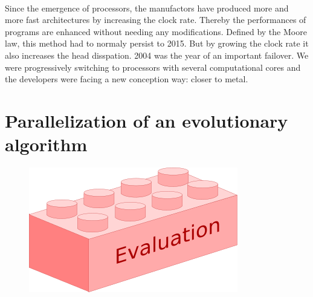 
\paragraph{}

Since the emergence of processors, the manufactors have produced more and more fast architectures by increasing the clock rate. Thereby the performances of programs are enhanced without needing any modifications. Defined by the Moore law, this method had to normaly persist to 2015. But by growing the clock rate it also increases the head disspation. 2004 was the year of an important failover. We were progressively switching to processors with several computational cores and the developers were facing a new conception way: closer to metal.

\section{}


\section{Parallelization of an evolutionary algorithm}

\begin{figure}[H]
  \centering
  \includegraphics[scale=0.5]{images/evaluation_box}
\end{figure}

